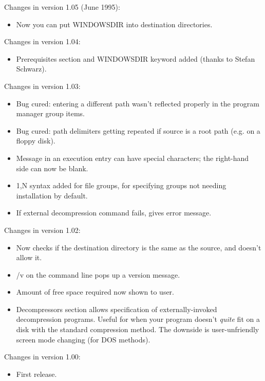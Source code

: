 Changes in version 1.05 (June 1995):

\begin{itemize}
\itemsep=0pt
\item Now you can put WINDOWSDIR into destination directories.
\end{itemize}

Changes in version 1.04:

\begin{itemize}
\itemsep=0pt
\item Prerequisites section and WINDOWSDIR keyword added (thanks to Stefan Schwarz).
\end{itemize}

Changes in version 1.03:

\begin{itemize}
\itemsep=0pt
\item Bug cured: entering a different path wasn't reflected properly
in the program manager group items.
\item Bug cured: path delimiters getting repeated if source is a root path
(e.g. on a floppy disk).
\item Message in an execution entry can have special characters;
the right-hand side can now be blank.
\item 1,N syntax added for file groups, for specifying groups not needing
installation by default.
\item If external decompression command fails, gives error message.
\end{itemize}

Changes in version 1.02:

\begin{itemize}
\itemsep=0pt
\item Now checks if the destination directory is the same
as the source, and doesn't allow it.
\item /v on the command line pops up a version message.
\item Amount of free space required now shown to user.
\item Decompressors section allows specification of
externally-invoked decompression programs. Useful for
when your program doesn't {\it quite} fit on a disk with the
standard compression method. The downside is user-unfriendly
screen mode changing (for DOS methods).
\end{itemize}

Changes in version 1.00:

\begin{itemize}
\itemsep=0pt
\item First release.
\end{itemize}

